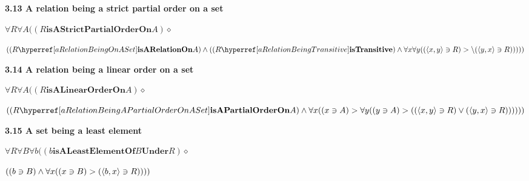 \documentclass{article}
\begin{document}
\par\bigskip{}\label{aRelationBeingAStrictPartialOrderOnASet}
\noindent\textbf{3.13 A relation being a strict partial order on a set}\par\smallskip
\noindent\(\displaystyle \forall R\forall A((R\mathbf{isAStrictPartialOrderOn} A)\diamond\)\par
\noindent\(\displaystyle (\On{R}{A}\land(\Trans{R}\land\forall x\forall y((\pair{x}{y}\owns R)>\backslash(\pair{y}{x}\owns R)))))\)\par

\par\bigskip{}\label{aRelationBeingALinearOrderOnASet}
\noindent\textbf{3.14 A relation being a linear order on a set}\par\smallskip
\noindent\(\displaystyle \forall R\forall A((R\mathbf{isALinearOrderOn} A)\diamond\)\par
\noindent\(\displaystyle (\PO{R}{A}\land\forall x((x\owns A)>\forall y((y\owns A)>((\pair{x}{y}\owns R)\lor(\pair{y}{x}\owns R))))))\)\par

\par\bigskip{}\label{aSetBeingALeastElement}
\noindent\textbf{3.15 A set being a least element}\par\smallskip
\noindent\(\displaystyle \forall R\forall B\forall b((b\mathbf{isALeastElementOf} B\mathbf{Under} R)\diamond\)\par
\noindent\(\displaystyle ((b\owns B)\land\forall x((x\owns B)>(\langle b,x\rangle\owns R))))\)\par
\end{document}
